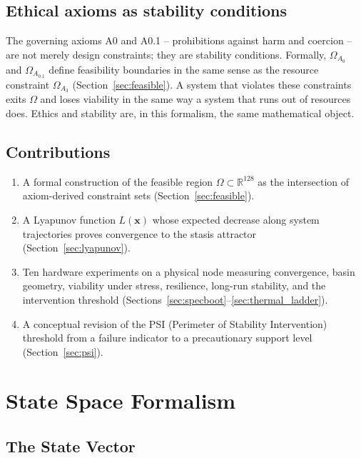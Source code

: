 \documentclass[11pt, a4paper]{article}
\newcommand{\R}{\mathbb{R}}
\newcommand{\sv}{\bm{x}}
\begin{document}
\subsection{Ethical axioms as stability conditions}

The governing axioms A0 and A0.1 -- prohibitions against harm and coercion --
are not merely design constraints; they are stability conditions.
Formally, $\Omega_{A_0}$ and $\Omega_{A_{0.1}}$ define feasibility
boundaries in the same sense as the resource constraint $\Omega_{A_3}$
(Section~\ref{sec:feasible}).
A system that violates these constraints exits $\Omega$ and loses
viability in the same way a system that runs out of resources does.
Ethics and stability are, in this formalism, the same mathematical object.

\subsection{Contributions}

\begin{enumerate}
  \item A formal construction of the feasible region $\Omega \subset \R^{128}$
        as the intersection of axiom-derived constraint sets
        (Section~\ref{sec:feasible}).
  \item A Lyapunov function $L(\sv)$ whose expected decrease along
        system trajectories proves convergence to the stasis attractor
        (Section~\ref{sec:lyapunov}).
  \item Ten hardware experiments on a physical node measuring convergence,
        basin geometry, viability under stress, resilience, long-run
        stability, and the intervention threshold
        (Sections~\ref{sec:specboot}--\ref{sec:thermal_ladder}).
  \item A conceptual revision of the PSI (Perimeter of Stability
        Intervention) threshold from a failure indicator to a
        precautionary support level (Section~\ref{sec:psi}).
\end{enumerate}


\section{State Space Formalism}
\label{sec:statespace}

\subsection{The State Vector}
\end{document}
